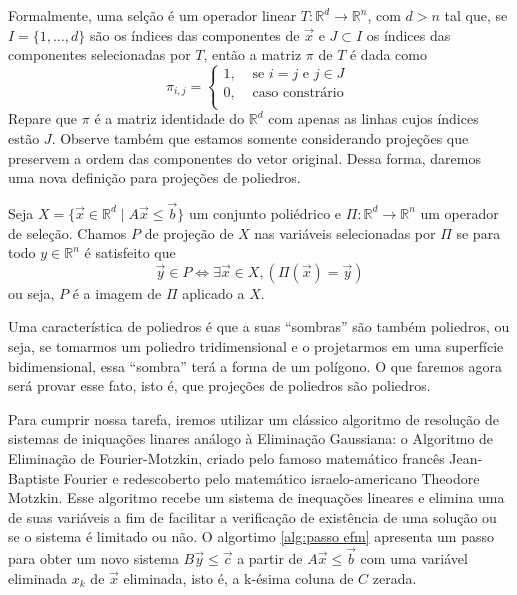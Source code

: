 Formalmente, uma selção é um operador linear $T: \mathbb{R}^d \to
\mathbb{R}^n$, com $d > n$ tal que, se $I = \{1, \ldots, d\}$ são os índices
das componentes de $\vec x$ e $J \subset I$ os índices das componentes
selecionadas por $T$, então a matriz $\pi$ de $T$ é dada como
\[
\pi_{i, j} = \begin{cases}
  1, &\text{ se } i=j \text{ e } j \in J\\
  0, &\text{ caso constrário } \\
\end{cases}
\]
Repare que $\pi$ é a matriz identidade do $\mathbb{R}^d$ com apenas as linhas
cujos índices estão $J$. Observe também que estamos somente considerando
projeções que preservem a ordem das componentes do vetor original. Dessa forma,
daremos uma nova definição para projeções de poliedros.

\begin{def:projecao2}
  Seja $X = \{\vec x \in \mathbb{R}^d \mid A \vec x \leq \vec b\}$ um
  conjunto poliédrico e $\Pi: \mathbb{R}^d \to \mathbb{R}^n$ um operador de
  seleção. Chamos $P$ de projeção de $X$ nas variáveis selecionadas por $\Pi$
  se para todo $y \in \mathbb{R}^n$ é satisfeito que
  \[
    \vec y \in P \Longleftrightarrow \exists \vec x \in X, (\Pi(\vec x) = \vec y)
  \]
  ou seja, $P$ é a imagem de $\Pi$ aplicado a $X$.
\end{def:projecao2}

Uma característica de poliedros é que a suas ``sombras'' são também poliedros,
ou seja, se tomarmos um poliedro tridimensional e o projetarmos em uma superfície
bidimensional, essa ``sombra'' terá a forma de um polígono. O que faremos
agora será provar esse fato, isto é, que projeções de poliedros são poliedros.

Para cumprir nossa tarefa, iremos utilizar um clássico algoritmo de resolução
de sistemas de iniquações linares análogo à Eliminação Gaussiana: o Algoritmo
de Eliminação de Fourier-Motzkin, criado pelo famoso matemático francês
Jean-Baptiste Fourier e redescoberto pelo matemático israelo-americano Theodore
Motzkin. Esse algoritmo recebe um sistema de inequações lineares e elimina uma
de suas variáveis a fim de facilitar a verificação de existência de uma solução
ou se o sistema é limitado ou não. O algortimo \ref{alg:passo efm} apresenta
um passo para obter um novo sistema $B \vec y \leq \vec c$ a partir de
$A \vec x \leq \vec b$ com uma variável eliminada $x_k$ de $\vec x$ eliminada,
isto é, a k-ésima coluna de $C$ zerada.

